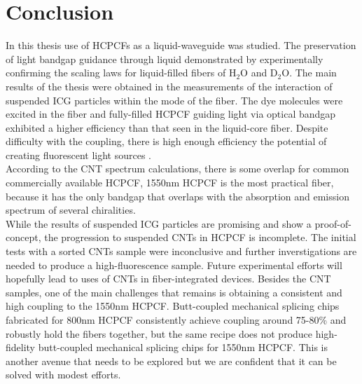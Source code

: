 \chapter{Conclusion}
In this thesis use of  HCPCFs as a liquid-waveguide was studied. The preservation of light bandgap guidance through liquid demonstrated by experimentally confirming the scaling laws for liquid-filled fibers of H${}_2$O and D${}_2$O.
The main results of the thesis were obtained in the measurements of the interaction of suspended ICG particles within the mode of the fiber. The dye molecules were excited in the fiber and fully-filled HCPCF guiding light via optical bandgap exhibited a higher efficiency than that seen in the liquid-core fiber. Despite difficulty with the coupling, there is high enough efficiency the potential of creating fluorescent light sources .\\

According to the CNT spectrum calculations, there is some overlap for common commercially available HCPCF, 1550nm HCPCF is the most practical fiber, because it has the only bandgap that overlaps with the absorption and emission spectrum of several chiralities.\\

While the results of suspended ICG particles are promising and show a proof-of-concept, the progression to suspended CNTs in HCPCF is incomplete. The initial tests with a sorted CNTs sample were inconclusive and further inverstigations are needed to produce a high-fluorescence sample. Future experimental efforts will hopefully lead to uses of CNTs in fiber-integrated devices. Besides the CNT samples, one of the main challenges that remains is obtaining a consistent and high coupling to the 1550nm HCPCF. Butt-coupled mechanical splicing chips fabricated for 800nm HCPCF consistently achieve coupling around 75-80\% and robustly hold the fibers together\cite{maruf}, but the same recipe does not produce high-fidelity butt-coupled mechanical splicing chips for 1550nm HCPCF. This is another avenue that needs to be explored but we are confident that it can be solved with modest efforts.\\
